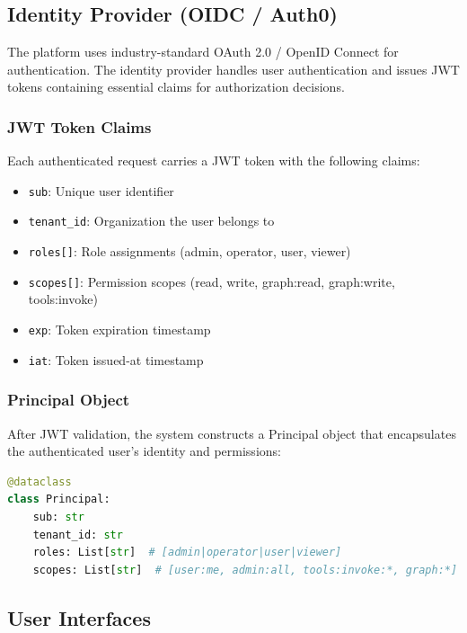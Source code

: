 \documentclass[a4paper,twoside]{sapthesis}
\begin{document}
\subsection{Identity Provider (OIDC / Auth0)}
\label{subsec:identity-provider}

The platform uses industry-standard OAuth 2.0 / OpenID Connect for authentication. The identity provider handles user authentication and issues JWT tokens containing essential claims for authorization decisions.

\subsubsection{JWT Token Claims}

Each authenticated request carries a JWT token with the following claims:

\begin{itemize}
    \item \texttt{sub}: Unique user identifier
    \item \texttt{tenant\_id}: Organization the user belongs to
    \item \texttt{roles[]}: Role assignments (admin, operator, user, viewer)
    \item \texttt{scopes[]}: Permission scopes (read, write, graph:read, graph:write, tools:invoke)
    \item \texttt{exp}: Token expiration timestamp
    \item \texttt{iat}: Token issued-at timestamp
\end{itemize}

\subsubsection{Principal Object}

After JWT validation, the system constructs a Principal object that encapsulates the authenticated user's identity and permissions:

\begin{lstlisting}[language=Python, caption={Principal object structure}]
@dataclass
class Principal:
    sub: str
    tenant_id: str
    roles: List[str]  # [admin|operator|user|viewer]
    scopes: List[str]  # [user:me, admin:all, tools:invoke:*, graph:*]
\end{lstlisting}

\subsection{User Interfaces}
\label{subsec:user-interfaces}
\end{document}
